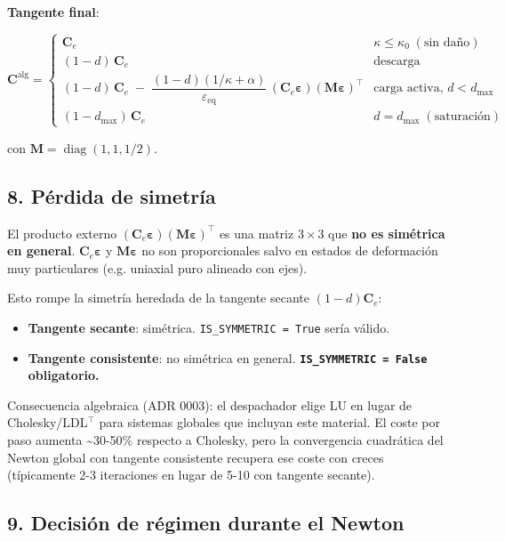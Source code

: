 \documentclass[11pt,letterpaper,oneside]{report}
\begin{document}
\textbf{Tangente final}:

\[
\mathbf C^\text{alg} = \begin{cases}
\mathbf C_e & \kappa \leq \kappa_0 \;(\text{sin daño}) \\
(1-d)\,\mathbf C_e & \text{descarga} \\
(1-d)\,\mathbf C_e \;-\; \dfrac{(1-d)(1/\kappa + \alpha)}{\varepsilon_\text{eq}}\,(\mathbf C_e\boldsymbol\varepsilon)(\mathbf M\boldsymbol\varepsilon)^\top & \text{carga activa, } d < d_\text{max} \\
(1-d_\text{max})\,\mathbf C_e & d = d_\text{max} \;(\text{saturación})
\end{cases}
\]

con $\mathbf M = \operatorname{diag}(1, 1, 1/2)$.

\subsection{8. Pérdida de simetría}

El producto externo $(\mathbf C_e\boldsymbol\varepsilon)(\mathbf M\boldsymbol\varepsilon)^\top$ es una matriz $3\times 3$ que \textbf{no es simétrica en general}. $\mathbf C_e\boldsymbol\varepsilon$ y $\mathbf M\boldsymbol\varepsilon$ no son proporcionales salvo en estados de deformación muy particulares (e.g. uniaxial puro alineado con ejes).

Esto rompe la simetría heredada de la tangente secante $(1-d)\mathbf C_e$:

\begin{itemize}
  \item \textbf{Tangente secante}: simétrica. \texttt{IS\_SYMMETRIC = True} sería válido.
  \item \textbf{Tangente consistente}: no simétrica en general. \textbf{\texttt{IS\_SYMMETRIC = False} obligatorio.}
\end{itemize}

Consecuencia algebraica (ADR 0003): el despachador elige LU en lugar de Cholesky/LDL\ensuremath{^{\top}} para sistemas globales que incluyan este material. El coste por paso aumenta \textasciitilde{}30-50\% respecto a Cholesky, pero la convergencia cuadrática del Newton global con tangente consistente recupera ese coste con creces (típicamente 2-3 iteraciones en lugar de 5-10 con tangente secante).

\subsection{9. Decisión de régimen durante el Newton}
\end{document}
